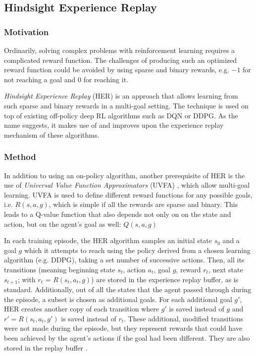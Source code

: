 \documentclass[runningheads]{llncs}
\begin{document}
\subsection{Hindsight Experience Replay}

\subsubsection{Motivation}

Ordinarily, solving complex problems with reinforcement learning requires a complicated reward function.  The challenges of producing such an optimized reward function could be avoided by using sparse and binary rewards, e.g. $-1$ for not reaching a goal and $0$ for reaching it.

\textit{Hindsight Experience Replay} (HER) \cite{andrychowicz2017hindsight} is an approach that allows learning from such sparse and binary rewards in a multi-goal setting. The technique is used on top of existing off-policy deep RL algorithms such as DQN or DDPG. As the name suggests, it makes use of and improves upon the experience replay mechanism of these algorithms.

\subsubsection{Method}

In addition to using an on-policy algorithm, another prerequisite of HER is the use of \textit{Universal Value Function Approximators} (UVFA) \cite{schaul2015universal}, which allow multi-goal learning. UVFA is used to define different reward functions for any possible goals, i.e. $R(s,a,g)$, which is simple if all the rewards are sparse and binary. This leads to a Q-value function that also depends not only on on the state and action, but on the agent's goal as well: $Q(s,a,g)$ \cite{andrychowicz2017hindsight}

In each training episode, the HER algorithm samples an initial state $s_0$ and a goal $g$ which it attempts to reach using the policy derived from a chosen learning algorithm (e.g. DDPG), taking a set number of successive actions. Then, all its transitions (meaning beginning state $s_t$, action $a_t$, goal $g$, reward $r_t$, next state $s_{t+1}$; with $r_t$ = $R(s_t,a_t,g)$) are stored in the experience replay buffer, as is standard. Additionally, out of all the states that the agent passed through during the episode, a subset is chosen as additional goals. For each additional goal $g'$, HER creates another copy of each transition where $g'$ is saved instead of $g$ and $r' = R(s_t,a_t,g')$ is saved instead of $r_t$. These additional, modified transitions were not made during the episode, but they represent rewards that could have been achieved by the agent's actions if the goal had been different. They are also stored in the replay buffer \cite{andrychowicz2017hindsight}.
\end{document}

